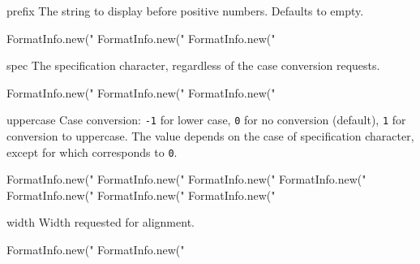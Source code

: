 \begin{urbiscriptapi}
\item[prefix]
  The string to display before positive numbers.  Defaults to empty.
\begin{urbiassert}
FormatInfo.new("%
FormatInfo.new("%
FormatInfo.new("%
\end{urbiassert}

\item[spec]
  The specification character, regardless of the case conversion
  requests.
\begin{urbiassert}
FormatInfo.new("%
FormatInfo.new("%
FormatInfo.new("%
\end{urbiassert}

\item[uppercase]
  Case conversion: \lstinline|-1| for lower case, \lstinline|0| for no
  conversion (default), \lstinline|1| for conversion to uppercase.
  The value depends on the case of specification character, except for
   which corresponds to \lstinline|0|.
\begin{urbiassert}
FormatInfo.new("%
FormatInfo.new("%
FormatInfo.new("%
FormatInfo.new("%
FormatInfo.new("%
FormatInfo.new("%
FormatInfo.new("%
\end{urbiassert}

\item[width]
  Width requested for alignment.
\begin{urbiassert}
FormatInfo.new("%
FormatInfo.new("%
\end{urbiassert}
\end{urbiscriptapi}

